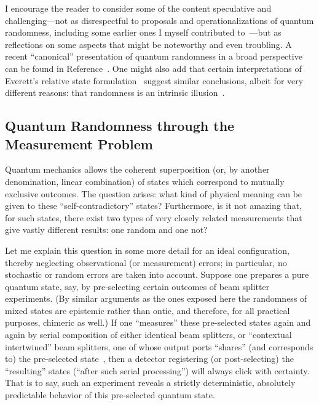 \documentclass[entropy,article,accept,oneauthor,pdftex]{Definitions/mdpi}
\begin{document}
I encourage the reader to consider some of the content speculative and challenging---not as disrespectful to proposals and operationalizations of quantum randomness,
including some earlier ones I myself contributed to~\cite{svozil-qct,svozil-2009-howto,2012-incomput-proofsCJ,Abbott:2010uq}---but as reflections on some
aspects that might be noteworthy and even troubling.
A recent ``canonical'' presentation of quantum randomness in a broad perspective can be found in Reference~\cite{Bera2017}.
One might also add that certain interpretations of Everett's relative state formulation~\cite{everett}
suggest similar conclusions, albeit for very different reasons:
that randomness is an intrinsic illusion~\cite{Vaidman2014}.


\subsection{Quantum Randomness through the Measurement Problem}

Quantum mechanics allows the coherent superposition (or, by another denomination, linear combination) of states which correspond to mutually exclusive outcomes.
The question arises: what kind of physical meaning can be given to these ``self-contradictory'' states?
Furthermore, is it not amazing that, for such states,
there exist two types of very closely related measurements that
give vastly different results: one random and one not?

Let me explain this question in some more detail for an ideal configuration, thereby neglecting observational (or measurement) errors;
in particular, no stochastic or random errors are taken into account.
Suppose one prepares a pure quantum state, say, by pre-selecting certain outcomes of beam splitter experiments.
(By similar arguments as the ones exposed here the randomness of mixed states are epistemic rather than ontic,
and therefore, for all practical purposes, chimeric as well.)
If one ``measures'' these pre-selected states again and again by serial composition of either identical beam splitters,
or ``contextual intertwined'' beam splitters, one of whose output ports ``shares'' (and corresponds to) the pre-selected state~\cite{svozil-1999-haunted-qc,svozil:040102,Griffiths2017,Griffiths2019},
then a detector registering (or post-selecting) the ``resulting'' states (``after such serial processing'') will  always click  with certainty.
That is to say, such an experiment reveals a strictly deterministic, absolutely predictable behavior of this pre-selected quantum state.
\end{document}
